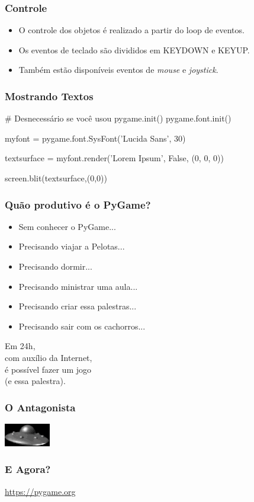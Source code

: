 \begin{frame}
    \frametitle{Controle}

    \begin{itemize}
        \item O controle dos objetos é realizado a partir do loop de eventos.
        \item Os eventos de teclado são divididos em KEYDOWN e KEYUP.
        \item Também estão disponíveis eventos de \textit{mouse} e
        \textit{joystick}.
    \end{itemize}
\end{frame}

\begin{frame}[fragile]
    \frametitle{Mostrando Textos}
    \begin{python}
        # Desnecessário se você usou pygame.init()
        pygame.font.init()

        myfont = pygame.font.SysFont('Lucida Sans', 30)

        textsurface = myfont.render('Lorem Ipsum', False, (0, 0, 0))

        screen.blit(textsurface,(0,0))
    \end{python}
\end{frame}

\begin{frame}
    \frametitle{Quão produtivo é o PyGame?}

    \begin{itemize}
        \item Sem conhecer o PyGame...
        \item Precisando viajar a Pelotas...
        \item Precisando dormir...
        \item Precisando ministrar uma aula...
        \item Precisando criar essa palestras...
        \item Precisando sair com os cachorros...
    \end{itemize}
\end{frame}

\begin{frame}
    \huge\centering
    Em 24h,\\com auxílio da Internet,\\é possível fazer um jogo\\(e essa palestra).
\end{frame}

\begin{frame}
    \frametitle{O Antagonista}

    \centering
    \includegraphics[height=1cm]{code/media/images/ufo_spin-7.jpg}
\end{frame}

\begin{frame}
    \frametitle{E Agora?}
    \centering
    \Huge\url{https://pygame.org}
\end{frame}


